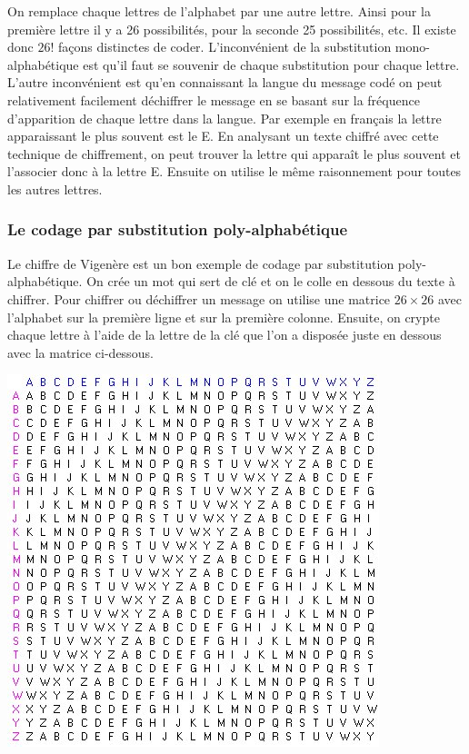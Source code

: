 \documentclass[a4paper,12pt]{article}
\begin{document}
On remplace chaque lettres de l'alphabet par une autre lettre. Ainsi pour la première lettre il y a 26 possibilités, pour la seconde 25 possibilités, etc. Il existe donc $26!$ façons distinctes de coder. L'inconvénient de la substitution mono-alphabétique est qu'il faut se souvenir de chaque substitution pour chaque lettre. L'autre inconvénient est qu'en connaissant la langue du message codé on peut relativement facilement déchiffrer le message en se basant sur la fréquence d'apparition de chaque lettre dans la langue. Par exemple en français la lettre apparaissant le plus souvent est le E. En analysant un texte chiffré avec cette technique de chiffrement, on peut trouver la lettre qui apparaît le plus souvent et l'associer donc à la lettre E. Ensuite on utilise le même raisonnement pour toutes les autres lettres.

\subsubsection{Le codage par substitution poly-alphabétique}

Le chiffre de Vigenère est un bon exemple de codage par substitution poly-alphabétique. On crée un mot qui sert de clé et on le \og colle \fg{} en dessous du texte à chiffrer. Pour chiffrer ou déchiffrer un message on utilise une matrice $26 \times 26$ avec l'alphabet sur la première ligne et sur la première colonne. Ensuite, on crypte chaque lettre à l'aide de la lettre de la clé que l'on a disposée juste en dessous avec la matrice ci-dessous.

\begin{center}
  \includegraphics[scale=0.5]{../Image/matrice.jpg}
\end{center}
\end{document}
